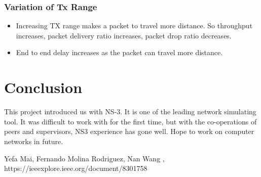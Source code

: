 \documentclass[12pt, a4paper]{article}
\begin{document}
\subsubsection{Variation of Tx Range}
\begin{itemize}
    \item Increasing TX range makes a packet to travel more distance. So throughput increases, packet delivery ratio increases, packet drop ratio decreases. 
    \item End to end delay increases as the packet can travel more distance.
\end{itemize}

\section{Conclusion}
This project introduced us with NS-3. It is one of the leading network simulating tool. It was difficult to work with for the first time, but with the co-operations of peers and supervisors, NS3 experience has gone well. Hope to work on computer networks in future.


\begin{thebibliography}{9}
Yefa Mai, Fernando Molina Rodriguez, Nan Wang , https://ieeexplore.ieee.org/document/8301758
\end{thebibliography}
\end{document}
